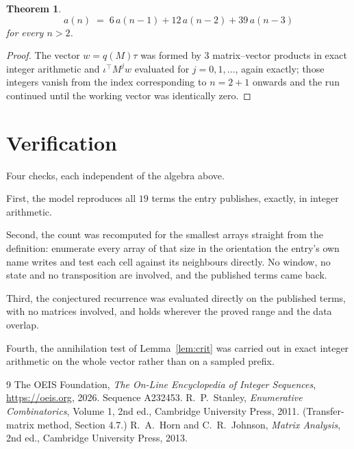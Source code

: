 \documentclass[11pt,a4paper]{article}
\theoremstyle{plain}
\newtheorem{theorem}{Theorem}
\theoremstyle{definition}
\begin{document}
\begin{theorem}
\[
a(n)\;=\;6\,a(n-1) + 12\,a(n-2) + 39\,a(n-3)
\]
for every $n>2$.
\end{theorem}

\begin{proof}
The vector $w=q(M)\tau$ was formed by $3$ matrix--vector products in exact integer
arithmetic and $\iota^{\!\top}M^{j}w$ evaluated for $j=0,1,\dots$, again exactly; those
integers vanish from the index corresponding to $n=2+1$ onwards and the run continued
until the working vector was identically zero.
\end{proof}

\section{Verification}

Four checks, each independent of the algebra above.

First, the model reproduces all $19$ terms the entry publishes, exactly, in integer
arithmetic.

Second, the count was recomputed for the smallest arrays straight from the definition:
enumerate every array of that size in the orientation the entry's own name writes and test each
cell against its neighbours directly. No window, no state and no transposition are involved,
and the published terms came back.

Third, the conjectured recurrence was evaluated directly on the published terms, with no
matrices involved, and holds wherever the proved range and the data overlap.

Fourth, the annihilation test of Lemma~\ref{lem:crit} was carried out in exact integer
arithmetic on the whole vector rather than on a sampled prefix.

\begin{thebibliography}{9}
 The OEIS Foundation, \emph{The On-Line Encyclopedia of Integer
Sequences}, \url{https://oeis.org}, 2026. Sequence A232453.
 R.~P.~Stanley, \emph{Enumerative Combinatorics}, Volume 1, 2nd ed.,
Cambridge University Press, 2011. (Transfer-matrix method, Section 4.7.)
 R.~A.~Horn and C.~R.~Johnson, \emph{Matrix Analysis}, 2nd ed., Cambridge
University Press, 2013.
\end{thebibliography}
\end{document}
